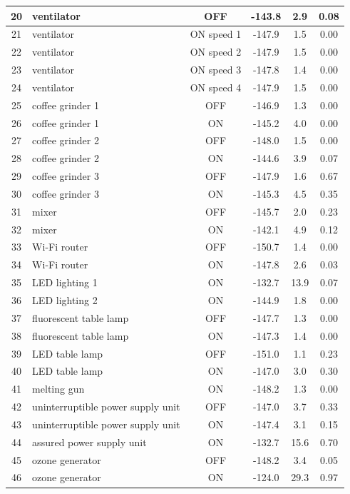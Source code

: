 \begin{longtable}{|c|p{}|c|c|c|c|}
20 & ventilator & OFF & -143.8 & 2.9 & 0.08 \\ \hline
21 & ventilator & ON speed 1 & -147.9 & 1.5 & 0.00 \\ \hline
22 & ventilator & ON speed 2 & -147.9 & 1.5 & 0.00 \\ \hline
23 & ventilator & ON speed 3 & -147.8 & 1.4 & 0.00 \\ \hline
24 & ventilator & ON speed 4 & -147.9 & 1.5 & 0.00 \\ \hline
25 & coffee grinder 1 & OFF & -146.9 & 1.3 & 0.00 \\ \hline
26 & coffee grinder 1 & ON & -145.2 & 4.0 & 0.00 \\ \hline
27 & coffee grinder 2 & OFF & -148.0 & 1.5 & 0.00 \\ \hline
28 & coffee grinder 2 & ON & -144.6 & 3.9 & 0.07 \\ \hline
29 & coffee grinder 3 & OFF & -147.9 & 1.6 & 0.67 \\ \hline
30 & coffee grinder 3 & ON & -145.3 & 4.5 & 0.35 \\ \hline
31 & mixer & OFF & -145.7 & 2.0 & 0.23 \\ \hline
32 & mixer & ON & -142.1 & 4.9 & 0.12 \\ \hline
33 & Wi-Fi router & OFF & -150.7 & 1.4 & 0.00 \\ \hline
34 & Wi-Fi router & ON & -147.8 & 2.6 & 0.03 \\ \hline
35 & LED lighting 1 & ON & -132.7 & 13.9 & 0.07 \\ \hline
36 & LED lighting 2 & ON & -144.9 & 1.8 & 0.00 \\ \hline
37 & fluorescent table lamp & OFF & -147.7 & 1.3 & 0.00 \\ \hline
38 & fluorescent table lamp & ON & -147.3 & 1.4 & 0.00 \\ \hline
39 & LED table lamp & OFF & -151.0 & 1.1 & 0.23 \\ \hline
40 & LED table lamp & ON & -147.0 & 3.0 & 0.30 \\ \hline
41 & melting gun & ON & -148.2 & 1.3 & 0.00 \\ \hline
42 & uninterruptible power supply unit & OFF & -147.0 & 3.7 & 0.33 \\ \hline
43 & uninterruptible power supply unit & ON & -147.4 & 3.1 & 0.15 \\ \hline
44 & assured power supply unit & ON & -132.7 & 15.6 & 0.70 \\ \hline
45 & ozone generator & OFF & -148.2 & 3.4 & 0.05 \\ \hline
46 & ozone generator & ON & -124.0 & 29.3 & 0.97 \\ \hline

\end{longtable}
